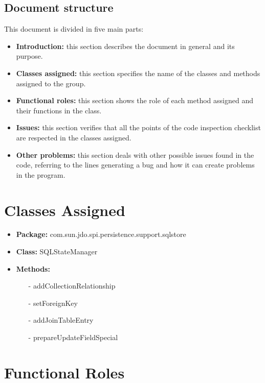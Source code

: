 \documentclass[18pt,oneside,a4paper, titlepage]{article}
\begin{document}
	\subsection{Document structure}
		This document is divided in five main parts:
		\begin{itemize}
			\item \textbf{Introduction:} this section describes the document in general and its purpose.
			\item  \textbf{Classes assigned:} this section specifies the name of the classes and methods assigned to the group.
			\item  \textbf{Functional roles:} this section shows the role of each method assigned and their functions in the class.
			\item  \textbf{Issues:} this section verifies that all the points of the code inspection checklist are respected in the classes assigned.
			\item  \textbf{Other problems:} this section deals with other possible issues found in the code, referring to the lines generating a bug and how it can create problems in the program.
		\end{itemize}

\newpage	
\section{Classes Assigned}
	\begin{itemize}
		\item  \textbf{Package:} com.sun.jdo.spi.persistence.support.sqlstore
		\item  \textbf{Class:} SQLStateManager
		\item  \textbf{Methods:}
			\begin{itemize}
				\item[-] addCollectionRelationship
				\item[-] setForeignKey
				\item[-] addJoinTableEntry
				\item[-] prepareUpdateFieldSpecial
				
			\end{itemize}
	\end{itemize}
		
\newpage
\section{Functional Roles}
\end{document}
